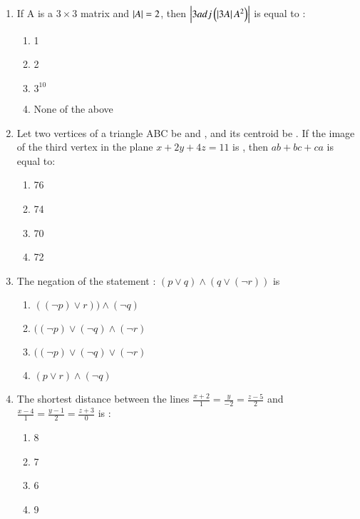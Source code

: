 \documentclass[journal]{IEEEtran}
\begin{document}
\begin{enumerate}
    \item If A is a $3\times 3$ matrix and $\left\vert A\right\vert=2$, then $\left\vert3adj\left(\left\vert3A\right\vert A^{2}\right)\right\vert$ is equal to :
		\begin{multicols}{1}
			\begin{enumerate}
				\item 1
    \item 2
    \item $3^{10}$
    \item None of the above
			\end{enumerate}
		\end{multicols}

    \item Let two vertices of a triangle ABC be  and , and its centroid be . If the image of the third vertex in the plane $x+2y+4z=11$ is , then $ab+bc+ca$ is equal to:
		\begin{multicols}{1}
			\begin{enumerate}
				
				\item 76
    \item 74
     \item 70
      \item 72
			\end{enumerate}
		\end{multicols}

    \item The negation of the statement : $(p \lor q) \land (q \lor (\neg r))$ is
    \begin{multicols}{1}
            \begin{enumerate}
              \item $((\neg p) \lor r)) \land (\neg q)$
              \item  $((\neg p) \lor (\neg q) \land(\neg r)$
              \item  $((\neg p) \lor (\neg q) \lor(\neg r)$
              \item $(p \lor r) \land  (\neg q)$
            \end{enumerate}
        \end{multicols}
    \item The shortest distance between the lines $\frac{x+2}{1}=\frac{y}{-2}=\frac{z-5}{2} $ and $\frac{x-4}{1}=\frac{y-1}{2}=\frac{z+3}{0}$ is :
    \begin{multicols}{1}
            \begin{enumerate}
              \item 8
              \item  7
              \item  6
              \item 9
            \end{enumerate}
        \end{multicols}


\end{enumerate}
\end{document}
